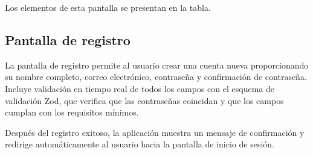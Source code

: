Los elementos de esta pantalla se presentan en la tabla.

\begin{table}[H]
  \centering
  \caption{Elementos de la pantalla de inicio de sesi\'on}
\end{table}

\subsection{Pantalla de registro}

La pantalla de registro permite al usuario crear una cuenta nueva proporcionando
su nombre completo, correo electr\'onico, contrase\~na y confirmaci\'on de
contrase\~na. Incluye validaci\'on en tiempo real de todos los campos con el
esquema de validaci\'on Zod, que verifica que las contrase\~nas coincidan y que
los campos cumplan con los requisitos m\'inimos.

Despu\'es del registro exitoso, la aplicaci\'on muestra un mensaje de
confirmaci\'on y redirige autom\'aticamente al usuario hacia la pantalla de
inicio de sesi\'on.

